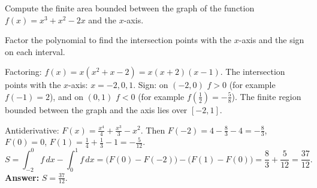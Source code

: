 
\begin{question}
Compute the finite area bounded between the graph of the function $f(x)=x^3+x^2-2x$ and the $x$-axis.
\end{question}

\begin{hint}
Factor the polynomial to find the intersection points with the $x$-axis and the sign on each interval.
\end{hint}

\begin{solution}
Factoring: $f(x)=x(x^2+x-2)=x(x+2)(x-1)$. The intersection points with the $x$-axis: $x=-2,0,1$. Sign: on $(-2,0)$ $f>0$ (for example $f(-1)=2$), and on $(0,1)$ $f<0$ (for example $f(\frac12)=-\frac58$). The finite region bounded between the graph and the axis lies over $[-2,1]$.

Antiderivative: $F(x)=\frac{x^4}{4}+\frac{x^3}{3}-x^2$. Then $F(-2)=4-\frac83-4=-\frac83$, $F(0)=0$, $F(1)=\frac14+\frac13-1=-\frac{5}{12}$.
\[ S=\int_{-2}^0 f\,dx-\int_0^1 f\,dx=\big(F(0)-F(-2)\big)-\big(F(1)-F(0)\big)=\frac83+\frac{5}{12}=\frac{37}{12}. \]
\textbf{Answer:} $S=\frac{37}{12}$.
\end{solution}
